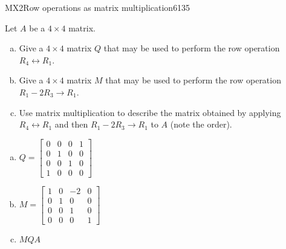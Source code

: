\begin{exercise}{MX2}{Row operations as matrix multiplication}{6135} 
\begin{exerciseStatement} 

Let \(A\) be a \(4 \times 4\) matrix.

 

\begin{enumerate}[(a)]
\item Give a \(4 \times 4\) matrix \(Q\) that may be used to perform the row operation \(R_4 \leftrightarrow R_1\).
\item Give a \(4 \times 4\) matrix \(M\) that may be used to perform the row operation \(R_1 - 2 R_3 \to R_1\).
\item Use matrix multiplication to describe the matrix obtained by applying \(R_4 \leftrightarrow R_1\) and then \(R_1 - 2 R_3 \to R_1\) to \(A\) (note the order). 
\end{enumerate}

     \end{exerciseStatement}
 \begin{exerciseAnswer} 

\begin{enumerate}[(a)]
\item \(Q=\left[\begin{array}{cccc}
0 & 0 & 0 & 1 \\
0 & 1 & 0 & 0 \\
0 & 0 & 1 & 0 \\
1 & 0 & 0 & 0
\end{array}\right]\)
\item \(M=\left[\begin{array}{cccc}
1 & 0 & -2 & 0 \\
0 & 1 & 0 & 0 \\
0 & 0 & 1 & 0 \\
0 & 0 & 0 & 1
\end{array}\right]\)
\item  \(MQA\) 
\end{enumerate}

     \end{exerciseAnswer}
 \end{exercise}


